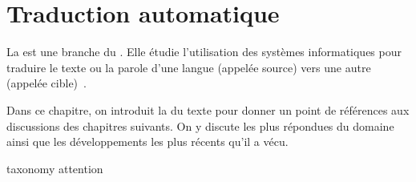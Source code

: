 \section{Traduction automatique}


La  est une branche du .
Elle étudie l'utilisation des systèmes informatiques pour traduire le texte ou la parole d'une langue (appelée source) vers une autre (appelée cible)~\cite{routledge}.

Dans ce chapitre, on introduit la  du texte pour donner un point de références aux discussions des chapitres suivants.
On y discute les plus répondues du domaine 
ainsi que les développements les plus récents qu'il a vécu.

{taxonomy}
{attention}